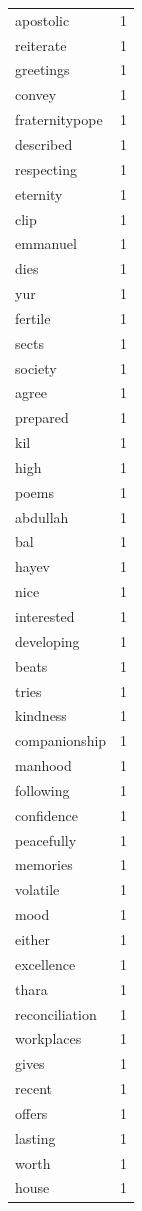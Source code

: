 \begin{tabular}{lr}
apostolic & 1 \\
reiterate & 1 \\
greetings & 1 \\
convey & 1 \\
fraternitypope & 1 \\
described & 1 \\
respecting & 1 \\
eternity & 1 \\
clip & 1 \\
emmanuel & 1 \\
dies & 1 \\
yur & 1 \\
fertile & 1 \\
sects & 1 \\
society & 1 \\
agree & 1 \\
prepared & 1 \\
kil & 1 \\
high & 1 \\
poems & 1 \\
abdullah & 1 \\
bal & 1 \\
hayev & 1 \\
nice & 1 \\
interested & 1 \\
developing & 1 \\
beats & 1 \\
tries & 1 \\
kindness & 1 \\
companionship & 1 \\
manhood & 1 \\
following & 1 \\
confidence & 1 \\
peacefully & 1 \\
memories & 1 \\
volatile & 1 \\
mood & 1 \\
either & 1 \\
excellence & 1 \\
thara & 1 \\
reconciliation & 1 \\
workplaces & 1 \\
gives & 1 \\
recent & 1 \\
offers & 1 \\
lasting & 1 \\
worth & 1 \\
house & 1 \\

\end{tabular}
